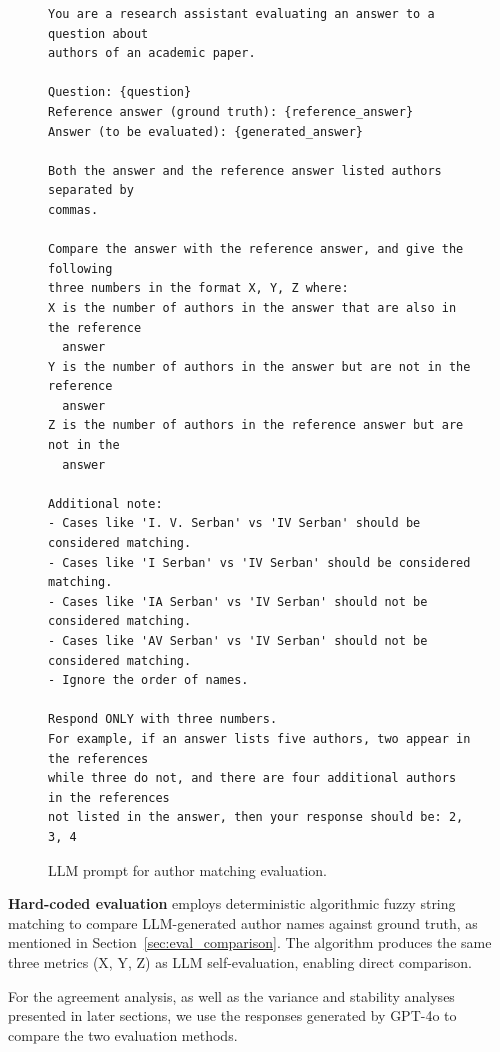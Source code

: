\documentclass[11pt]{article}
\begin{document}
\begin{figure}[htbp]
\centering
\begin{tcolorbox}[colback=gray!5, colframe=gray!80, boxrule=0.5pt, arc=2mm, title=\textbf{LLM Prompt for Author Matching Evaluation}]
\small
\begin{verbatim}
You are a research assistant evaluating an answer to a question about
authors of an academic paper.

Question: {question}
Reference answer (ground truth): {reference_answer}
Answer (to be evaluated): {generated_answer}

Both the answer and the reference answer listed authors separated by
commas.

Compare the answer with the reference answer, and give the following
three numbers in the format X, Y, Z where:
X is the number of authors in the answer that are also in the reference
  answer
Y is the number of authors in the answer but are not in the reference
  answer
Z is the number of authors in the reference answer but are not in the
  answer

Additional note:
- Cases like 'I. V. Serban' vs 'IV Serban' should be considered matching.
- Cases like 'I Serban' vs 'IV Serban' should be considered matching.
- Cases like 'IA Serban' vs 'IV Serban' should not be considered matching.
- Cases like 'AV Serban' vs 'IV Serban' should not be considered matching.
- Ignore the order of names.

Respond ONLY with three numbers.
For example, if an answer lists five authors, two appear in the references
while three do not, and there are four additional authors in the references
not listed in the answer, then your response should be: 2, 3, 4
\end{verbatim}
\end{tcolorbox}
\caption{LLM prompt for author matching evaluation.}
\label{fig:prompt_evaluation}
\end{figure}

\textbf{Hard-coded evaluation} employs deterministic algorithmic fuzzy string matching to compare LLM-generated author names against ground truth, as mentioned in Section~\ref{sec:eval_comparison}.
The algorithm produces the same three metrics (X, Y, Z) as LLM self-evaluation, enabling direct comparison.

For the agreement analysis, as well as the variance and stability analyses presented in later sections, we use the responses generated by GPT-4o to compare the two evaluation methods.
\end{document}
